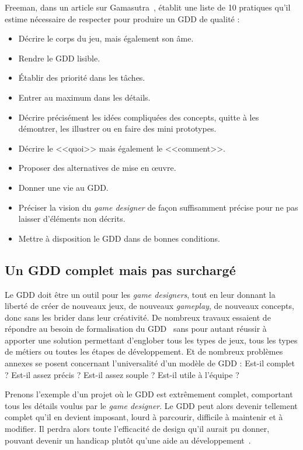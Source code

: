 Freeman, dans un article sur Gamasutra~\cite{gama_greateGDD}, établit une liste de 10 pratiques qu'il estime nécessaire de respecter pour produire un GDD de qualité :
\begin{itemize}
    \item Décrire le corps du jeu, mais également son âme.
    \item Rendre le GDD lisible.
    \item Établir des priorité dans les tâches.
    \item Entrer au maximum dans les détails.
    \item Décrire précisément les idées compliquées des concepts, quitte à les démontrer, les illustrer ou en faire des mini prototypes.
    \item Décrire le <<quoi>> mais également le <<comment>>.
    \item Proposer des alternatives de mise en \oe{}uvre.
    \item Donner une vie au GDD.
    \item Pr\'eciser la vision du \emph{game designer} de fa\c{c}on suffisamment précise pour ne pas laisser d'éléments non décrits.
    \item Mettre à disposition le GDD dans de bonnes conditions.
\end{itemize}

\subsection{Un GDD complet mais pas surchargé}


Le GDD doit \^etre un outil pour les \emph{game designers}, tout en leur donnant la liberté de créer de nouveaux jeux, de nouveaux \emph{gameplay}, de nouveaux concepts, donc sans les brider dans leur cr\'eativit\'e.
De nombreux travaux essaient de répondre au besoin de formalisation du GDD~\cite{GDD_software,multiview,GDD_GDProject,gama_greateGDD} sans pour autant réussir à apporter une solution permettant d'englober tous les types de jeux, tous les types de métiers ou toutes les étapes de développement.
Et de nombreux problèmes annexes se posent concernant l'universalité d'un modèle de GDD : Est-il complet ? Est-il assez précis ? Est-il assez souple ? Est-il utile à l'équipe ? 

Prenons l'exemple d'un projet où le GDD est extrêmement complet, comportant tous les détails voulus par le \emph{game designer}.
Le GDD peut alors devenir tellement complet qu'il en devient imposant, lourd à parcourir, difficile à maintenir et à modifier.
Il perdra alors toute l'efficacité de design qu'il aurait pu donner, pouvant devenir un handicap plutôt qu'une aide au développement~\cite{onepage_librande}.

